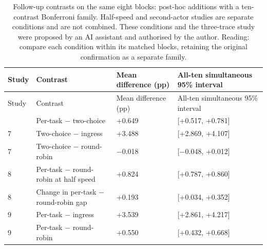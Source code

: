 \documentclass[12pt,a4paper]{article}
\begin{document}
\begingroup
\singlespacing\footnotesize\setlength{\tabcolsep}{3pt}
\renewcommand{\thetable}{7a}
\begin{xltabular}{\textwidth}{@{}YYYY@{}}
\caption[Declared follow-up contrasts]{Follow-up contrasts on the same eight blocks: post-hoc additions with a ten-contrast Bonferroni family. Half-speed and second-actor studies are separate conditions and are not combined. These conditions and the three-trace study were proposed by an AI assistant and authorised by the author. Reading: compare each condition within its matched blocks, retaining the original confirmation as a separate family.}\label{tab:7a} \\
\toprule
Study & Contrast & Mean difference (pp) & All-ten simultaneous 95\% interval \\
\midrule\endfirsthead
\toprule
Study & Contrast & Mean difference (pp) & All-ten simultaneous 95\% interval \\
\midrule\endhead
\bottomrule{} & Per-task \ensuremath{-} two-choice & +0.649 & [+0.517, +0.781] \\
7 & Two-choice \ensuremath{-} ingress & +3.488 & [+2.869, +4.107] \\
7 & Two-choice \ensuremath{-} round-robin & \ensuremath{-}0.018 & [\ensuremath{-}0.048, +0.012] \\
8 & Per-task \ensuremath{-} round-robin at half speed & +0.824 & [+0.787, +0.860] \\
8 & Change in per-task \ensuremath{-} round-robin gap & +0.193 & [+0.034, +0.352] \\
9 & Per-task \ensuremath{-} ingress & +3.539 & [+2.861, +4.217] \\
9 & Per-task \ensuremath{-} round-robin & +0.550 & [+0.432, +0.668] \\
\end{xltabular}
\endgroup
\end{document}
